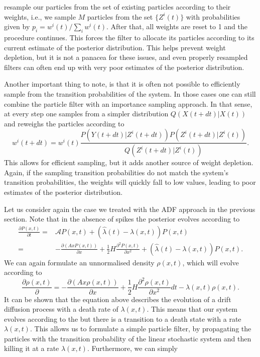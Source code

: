 resample our particles from the set of existing particles according to their weights, i.e., we sample $M$ particles from the set $\{Z^i(t)\}$ with probabilities given by
$p_i = w^i(t)/\sum_i w^i(t)$. After that, all weights are reset to 1 and the procedure continues. This forces
the filter to allocate its particles according to its current estimate of the posterior distribution. This helps prevent weight depletion, but it is not a panacea for these 
issues, and even properly resampled filters can often end up with very poor estimates of the posterior distribution.\par
Another important thing to note, is that it is often not possible to efficiently sample from the transition probabilities of the system. In those cases one can still combine
the particle filter with an importance sampling approach. In that sense, at every step one samples from a simpler distribution $Q(X(t+dt)|X(t))$ and reweighs the 
particles according to 
\[
w^i(t+dt) = w^i(t) \frac{P(Y(t+dt) | Z^i(t+dt)) P(Z^i(t+dt)|Z^i(t))}{Q(Z^i(t+dt)|Z^i(t))}.
\]
This allows for efficient sampling, but it adds another source of
weight depletion. Again, if the sampling transition probabilities do not match the system's transition probabilities, the weights will quickly fall to low values, leading to
poor estimates of the posterior distribution.\par
Let us consider again the case we treated with the ADF approach in the previous section. Note that in the absence of spikes the posterior evolves according to
\begin{align*}
\frac{\partial P(x,t)}{\partial t} =& \mathcal{A} P(x,t) + (\hat{\lambda}(t) - \lambda(x,t) ) P(x,t) \\
=& -\frac{\partial \left(Ax P(x,t)\right)}{\partial x} + \frac{1}{2} H \frac{\partial^2 P(x,t)}{\partial x^2}+ (\hat{\lambda}(t) - \lambda(x,t) ) P(x,t).
\end{align*}
We can again formulate an unnormalised density $\rho(x,t)$, which will evolve according to
\[
\frac{\partial \rho(x,t)}{\partial } =-\frac{\partial \left(Ax \rho(x,t)\right)}{\partial x} + \frac{1}{2} H \frac{\partial^2 \rho(x,t)}{\partial x^2}dt -\lambda(x,t) \rho(x,t).
\]
It can be shown that the equation above describes the evolution of a drift diffusion process with a death rate of $\lambda(x,t)$. This means that our system evolves
according to the  but there is a transition to a death state with a rate $\lambda(x,t)$.\cite{Oksendal2003} This allows us to formulate a simple particle 
filter, by propagating the particles with the transition probability of the linear stochastic system and then killing it at a rate $\lambda(x,t)$. Furthermore, we can simply
